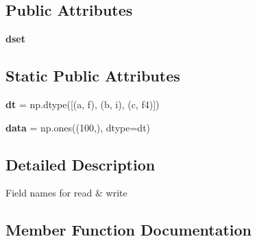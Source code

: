 \subsection*{Public Attributes}
\begin{DoxyCompactItemize}
\item 
\mbox{\label{classh5py__LOCAL_1_1tests_1_1old_1_1test__slicing_1_1TestFieldNames_a1423101b939b466e926bc82a8ee9a9b0}} 
{\bfseries dset}
\end{DoxyCompactItemize}
\subsection*{Static Public Attributes}
\begin{DoxyCompactItemize}
\item 
\mbox{\label{classh5py__LOCAL_1_1tests_1_1old_1_1test__slicing_1_1TestFieldNames_aa4e57d361e4eb4b71624046025b3190e}} 
{\bfseries dt} = np.\+dtype(\mbox{[}(\textquotesingle{}a\textquotesingle{}, \textquotesingle{}f\textquotesingle{}), (\textquotesingle{}b\textquotesingle{}, \textquotesingle{}i\textquotesingle{}), (\textquotesingle{}c\textquotesingle{}, \textquotesingle{}f4\textquotesingle{})\mbox{]})
\item 
\mbox{\label{classh5py__LOCAL_1_1tests_1_1old_1_1test__slicing_1_1TestFieldNames_aa05239ef369f2ae6c2554cacd510a3cd}} 
{\bfseries data} = np.\+ones((100,), dtype=dt)
\end{DoxyCompactItemize}


\subsection{Detailed Description}
\begin{DoxyVerb}    Field names for read & write
\end{DoxyVerb}
 

\subsection{Member Function Documentation}
\mbox{\label{classh5py__LOCAL_1_1tests_1_1old_1_1test__slicing_1_1TestFieldNames_aba57171a26a29f99b9dc7c67dea49774}} 
